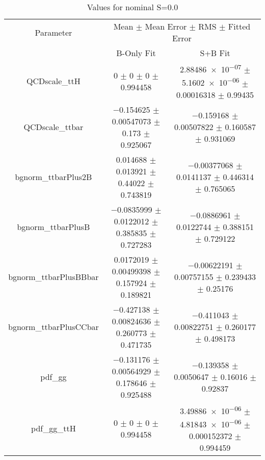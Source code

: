 \begin{table}
\centering
\caption{Values for nominal S=0.0}
\begin{tabular}{ccc}
\toprule
Parameter & \multicolumn{2}{c}{Mean $\pm$ Mean Error $\pm$ RMS $\pm$ Fitted Error}\\
 & B-Only Fit & S+B Fit\\
\midrule
QCDscale\_ttH & \num{0} $\pm$ \num{0} $\pm$ \num{0} $\pm$ \num{0.994458} & \num{2.88486e-07} $\pm$ \num{5.1602e-06} $\pm$ \num{0.00016318} $\pm$ \num{0.99435}\\
QCDscale\_ttbar & \num{-0.154625} $\pm$ \num{0.00547073} $\pm$ \num{0.173} $\pm$ \num{0.925067} & \num{-0.159168} $\pm$ \num{0.00507822} $\pm$ \num{0.160587} $\pm$ \num{0.931069}\\
bgnorm\_ttbarPlus2B & \num{0.014688} $\pm$ \num{0.013921} $\pm$ \num{0.44022} $\pm$ \num{0.743819} & \num{-0.00377068} $\pm$ \num{0.0141137} $\pm$ \num{0.446314} $\pm$ \num{0.765065}\\
bgnorm\_ttbarPlusB & \num{-0.0835999} $\pm$ \num{0.0122012} $\pm$ \num{0.385835} $\pm$ \num{0.727283} & \num{-0.0886961} $\pm$ \num{0.0122744} $\pm$ \num{0.388151} $\pm$ \num{0.729122}\\
bgnorm\_ttbarPlusBBbar & \num{0.0172019} $\pm$ \num{0.00499398} $\pm$ \num{0.157924} $\pm$ \num{0.189821} & \num{-0.00622191} $\pm$ \num{0.00757155} $\pm$ \num{0.239433} $\pm$ \num{0.25176}\\
bgnorm\_ttbarPlusCCbar & \num{-0.427138} $\pm$ \num{0.00824636} $\pm$ \num{0.260773} $\pm$ \num{0.471735} & \num{-0.411043} $\pm$ \num{0.00822751} $\pm$ \num{0.260177} $\pm$ \num{0.498173}\\
pdf\_gg & \num{-0.131176} $\pm$ \num{0.00564929} $\pm$ \num{0.178646} $\pm$ \num{0.925488} & \num{-0.139358} $\pm$ \num{0.0050647} $\pm$ \num{0.16016} $\pm$ \num{0.92837}\\
pdf\_gg\_ttH & \num{0} $\pm$ \num{0} $\pm$ \num{0} $\pm$ \num{0.994458} & \num{3.49886e-06} $\pm$ \num{4.81843e-06} $\pm$ \num{0.000152372} $\pm$ \num{0.994459}\\
\bottomrule
\end{tabular}
\end{table}